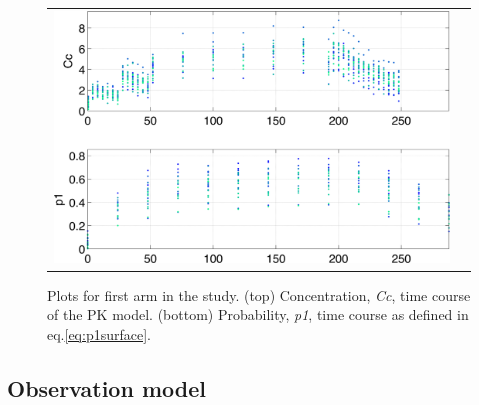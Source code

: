 \begin{figure}[htbp]
\centering
\begin{tabular}{cc}
\includegraphics[width=.6\textwidth]{pics/p1_armA} 
\end{tabular}
\caption{Plots for first arm in the study. (top) Concentration, \emph{Cc}, time course of the PK model. 
(bottom) Probability, \emph{p1}, time course as defined in eq.\ref{eq:p1surface}.}
\label{fig:lambdasurface}
\end{figure}


\subsection{Observation model}

